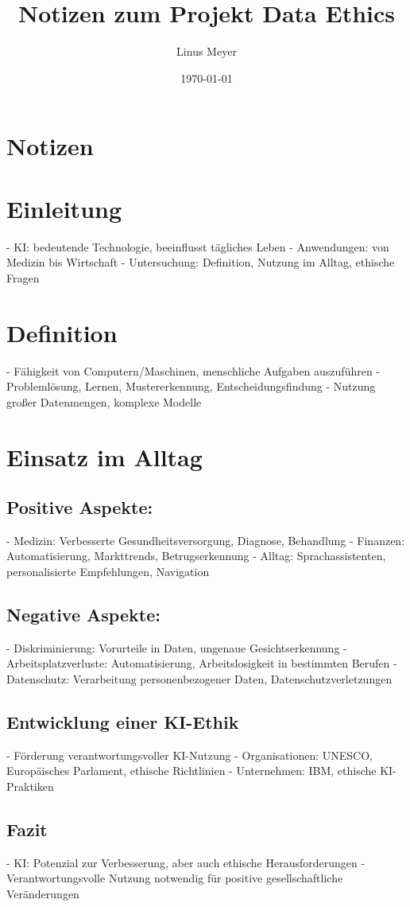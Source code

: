 \documentclass{article}
\title{Notizen zum Projekt Data Ethics}
\author{Linus Meyer}
\date{\today}
\begin{document}
\maketitle

\section{Notizen}
\section{Einleitung} 

- KI: bedeutende Technologie, beeinflusst tägliches Leben
- Anwendungen: von Medizin bis Wirtschaft
- Untersuchung: Definition, Nutzung im Alltag, ethische Fragen

\section{ Definition}

- Fähigkeit von Computern/Maschinen, menschliche Aufgaben auszuführen
- Problemlösung, Lernen, Mustererkennung, Entscheidungsfindung
- Nutzung großer Datenmengen, komplexe Modelle

\section{Einsatz im Alltag} 

\subsection{ Positive Aspekte:}
  - Medizin: Verbesserte Gesundheitsversorgung, Diagnose, Behandlung
  - Finanzen: Automatisierung, Markttrends, Betrugserkennung
  - Alltag: Sprachassistenten, personalisierte Empfehlungen, Navigation
  
\subsection{Negative Aspekte:} 
  - Diskriminierung: Vorurteile in Daten, ungenaue Gesichtserkennung
  - Arbeitsplatzverluste: Automatisierung, Arbeitslosigkeit in bestimmten Berufen
  - Datenschutz: Verarbeitung personenbezogener Daten, Datenschutzverletzungen

\subsection{Entwicklung einer KI-Ethik} 

- Förderung verantwortungsvoller KI-Nutzung
- Organisationen: UNESCO, Europäisches Parlament, ethische Richtlinien
- Unternehmen: IBM, ethische KI-Praktiken

\subsection{Fazit}

- KI: Potenzial zur Verbesserung, aber auch ethische Herausforderungen
- Verantwortungsvolle Nutzung notwendig für positive gesellschaftliche Veränderungen
\end{document}

